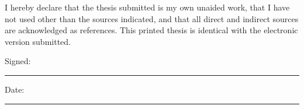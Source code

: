 \noindent I hereby declare that the thesis submitted is my own unaided work, that I have not used other than the sources indicated, and that all direct and indirect sources are acknowledged as references. This printed thesis is identical with the electronic version submitted.

 
\noindent Signed:\\
\rule[0.5em]{25em}{0.5pt} %
 
\noindent Date:\\
\rule[0.5em]{25em}{0.5pt} %

